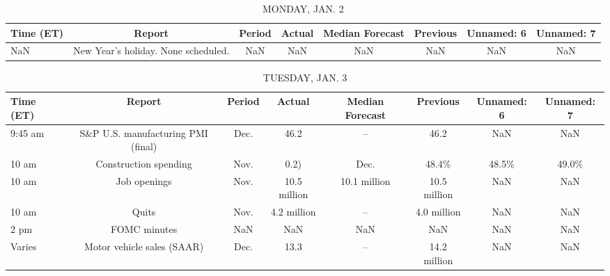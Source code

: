 \documentclass{article}%
\begin{document}
%
\normalsize%


\begin{table}[htbp]%
\caption{MONDAY, JAN. 2}%
\centering%
\begin{adjustbox}{width=1\textwidth}%
\begin{tabular}{lccccccc}
\toprule
Time (ET) &                              Report & Period & Actual & Median Forecast & Previous & Unnamed: 6 & Unnamed: 7 \\
\midrule
      NaN & New Year's holiday. None scheduled. &    NaN &    NaN &             NaN &      NaN &        NaN &        NaN \\
\bottomrule
\end{tabular}
%
\end{adjustbox}%
\end{table}

%


\begin{table}[htbp]%
\caption{TUESDAY, JAN. 3}%
\centering%
\begin{adjustbox}{width=1\textwidth}%
\begin{tabular}{lccccccc}
\toprule
Time (ET) &                             Report & Period &       Actual & Median Forecast &     Previous & Unnamed: 6 & Unnamed: 7 \\
\midrule
  9:45 am & S\&P U.S. manufacturing PMI (final) &   Dec. &         46.2 &              -- &         46.2 &        NaN &        NaN \\
    10 am &              Construction spending &   Nov. &         0.2) &            Dec. &        48.4\% &      48.5\% &      49.0\% \\
    10 am &                       Job openings &   Nov. & 10.5 million &    10.1 million & 10.5 million &        NaN &        NaN \\
    10 am &                              Quits &   Nov. &  4.2 million &              -- &  4.0 million &        NaN &        NaN \\
     2 pm &                       FOMC minutes &    NaN &          NaN &             NaN &          NaN &        NaN &        NaN \\
   Varies &         Motor vehicle sales (SAAR) &   Dec. &         13.3 &              -- & 14.2 million &        NaN &        NaN \\
\bottomrule
\end{tabular}
%
\end{adjustbox}%
\end{table}
\end{document}
